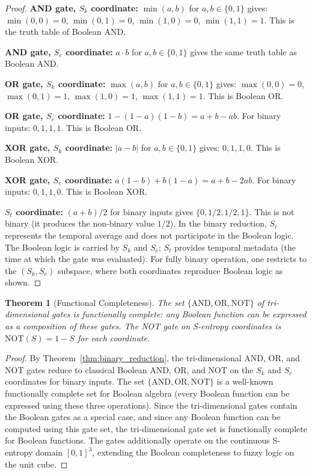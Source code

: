 \documentclass[twocolumn,10pt]{article}
\newtheorem{theorem}{Theorem}[section]
\theoremstyle{remark}
\newcommand{\Sk}{S_k}
\newcommand{\St}{S_t}
\newcommand{\Se}{S_e}
\begin{document}
\begin{proof}
\textbf{AND gate, $\Sk$ coordinate:} $\min(a, b)$ for $a, b \in \{0, 1\}$ gives: $\min(0,0) = 0$, $\min(0,1) = 0$, $\min(1,0) = 0$, $\min(1,1) = 1$. This is the truth table of Boolean AND.

\textbf{AND gate, $\Se$ coordinate:} $a \cdot b$ for $a, b \in \{0, 1\}$ gives the same truth table as Boolean AND.

\textbf{OR gate, $\Sk$ coordinate:} $\max(a, b)$ for $a, b \in \{0, 1\}$ gives: $\max(0,0) = 0$, $\max(0,1) = 1$, $\max(1,0) = 1$, $\max(1,1) = 1$. This is Boolean OR.

\textbf{OR gate, $\Se$ coordinate:} $1 - (1-a)(1-b) = a + b - ab$. For binary inputs: $0, 1, 1, 1$. This is Boolean OR.

\textbf{XOR gate, $\Sk$ coordinate:} $|a - b|$ for $a, b \in \{0, 1\}$ gives: $0, 1, 1, 0$. This is Boolean XOR.

\textbf{XOR gate, $\Se$ coordinate:} $a(1-b) + b(1-a) = a + b - 2ab$. For binary inputs: $0, 1, 1, 0$. This is Boolean XOR.

\textbf{$\St$ coordinate:} $(a + b)/2$ for binary inputs gives $\{0, 1/2, 1/2, 1\}$. This is not binary (it produces the non-binary value $1/2$). In the binary reduction, $\St$ represents the temporal average and does not participate in the Boolean logic. The Boolean logic is carried by $\Sk$ and $\Se$; $\St$ provides temporal metadata (the time at which the gate was evaluated). For fully binary operation, one restricts to the $(\Sk, \Se)$ subspace, where both coordinates reproduce Boolean logic as shown.
\end{proof}

\begin{theorem}[Functional Completeness]
\label{thm:completeness_logic}
The set $\{\mathrm{AND}, \mathrm{OR}, \mathrm{NOT}\}$ of tri-dimensional gates is functionally complete: any Boolean function can be expressed as a composition of these gates. The NOT gate on S-entropy coordinates is $\mathrm{NOT}(S) = 1 - S$ for each coordinate.
\end{theorem}

\begin{proof}
By Theorem~\ref{thm:binary_reduction}, the tri-dimensional AND, OR, and NOT gates reduce to classical Boolean AND, OR, and NOT on the $\Sk$ and $\Se$ coordinates for binary inputs. The set $\{\mathrm{AND}, \mathrm{OR}, \mathrm{NOT}\}$ is a well-known functionally complete set for Boolean algebra (every Boolean function can be expressed using these three operations). Since the tri-dimensional gates contain the Boolean gates as a special case, and since any Boolean function can be computed using this gate set, the tri-dimensional gate set is functionally complete for Boolean functions. The gates additionally operate on the continuous S-entropy domain $[0,1]^3$, extending the Boolean completeness to fuzzy logic on the unit cube.
\end{proof}
\end{document}
